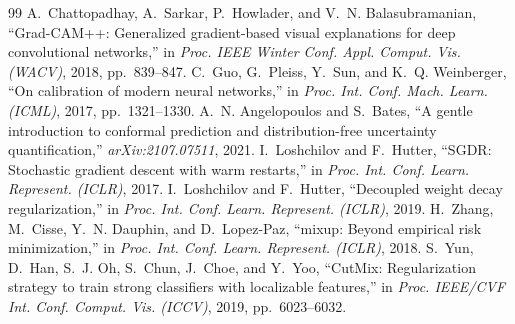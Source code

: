 \documentclass[conference]{IEEEtran}
\begin{document}
\begin{thebibliography}{99}
 A.~Chattopadhay, A.~Sarkar, P.~Howlader, and V.~N. Balasubramanian, ``Grad-CAM++: Generalized gradient-based visual explanations for deep convolutional networks,'' in \emph{Proc. IEEE Winter Conf. Appl. Comput. Vis. (WACV)}, 2018, pp.~839--847.
 C.~Guo, G.~Pleiss, Y.~Sun, and K.~Q. Weinberger, ``On calibration of modern neural networks,'' in \emph{Proc. Int. Conf. Mach. Learn. (ICML)}, 2017, pp.~1321--1330.
 A.~N. Angelopoulos and S.~Bates, ``A gentle introduction to conformal prediction and distribution-free uncertainty quantification,'' \emph{arXiv:2107.07511}, 2021.
 I.~Loshchilov and F.~Hutter, ``SGDR: Stochastic gradient descent with warm restarts,'' in \emph{Proc. Int. Conf. Learn. Represent. (ICLR)}, 2017.
 I.~Loshchilov and F.~Hutter, ``Decoupled weight decay regularization,'' in \emph{Proc. Int. Conf. Learn. Represent. (ICLR)}, 2019.
 H.~Zhang, M.~Cisse, Y.~N. Dauphin, and D.~Lopez-Paz, ``mixup: Beyond empirical risk minimization,'' in \emph{Proc. Int. Conf. Learn. Represent. (ICLR)}, 2018.
 S.~Yun, D.~Han, S.~J. Oh, S.~Chun, J.~Choe, and Y.~Yoo, ``CutMix: Regularization strategy to train strong classifiers with localizable features,'' in \emph{Proc. IEEE/CVF Int. Conf. Comput. Vis. (ICCV)}, 2019, pp.~6023--6032.
\end{thebibliography}
\end{document}
